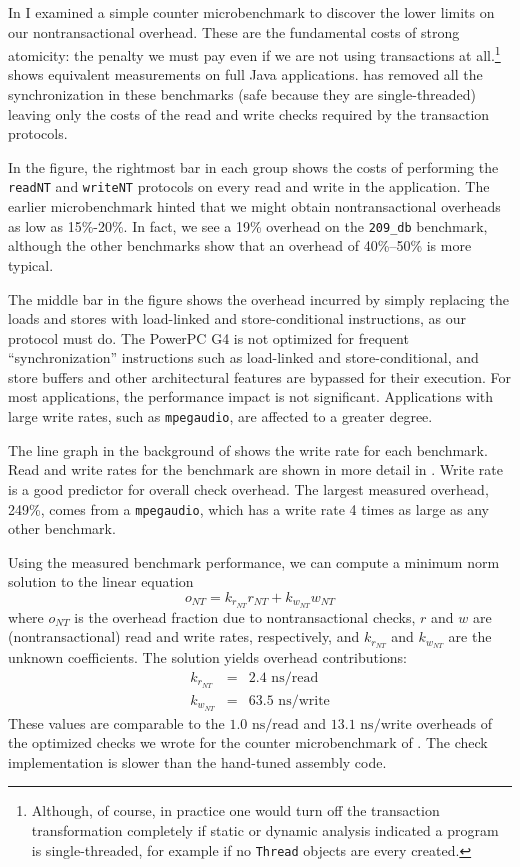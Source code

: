 In  I examined a simple counter microbenchmark
to discover the
lower limits on our nontransactional overhead.  These are the
fundamental costs of strong atomicity: the penalty we must pay even if
we are not using transactions at all.\footnote{Although, of course, in
  practice one would turn off the transaction transformation
  completely if static or dynamic analysis indicated a program is
  single-threaded, for example if no \texttt{Thread} objects are every
  created.}   shows equivalent measurements on
full Java applications.  \Flex has removed all the synchronization in
these benchmarks (safe because they are single-threaded) leaving only
the costs of the read and write checks required by the transaction
protocols.

In the figure, the rightmost bar in each group shows the costs of
performing the \texttt{readNT} and \texttt{writeNT} protocols on every
read and write in the application.  
The earlier microbenchmark hinted that we might obtain
nontransactional overheads as low as 15\%-20\%.
In fact, we see a 19\%
overhead on the \texttt{209\_db} benchmark, although the other
benchmarks show that an overhead of 40\%--50\% is more typical.

The middle bar in the figure shows the overhead incurred by simply
replacing the loads and stores with load-linked and store-conditional
instructions, as our protocol must do.  The PowerPC G4 is not optimized
for frequent ``synchronization'' instructions such as
load-linked and store-conditional, and store buffers and other
architectural features are bypassed for their execution.  For most
applications, the performance impact is not significant.  Applications
with large write rates, such as \texttt{mpegaudio}, are affected to a
greater degree.

The line graph in the background of  shows the
write rate for each benchmark.  Read and write rates for the benchmark
are shown in more detail in .  Write rate is
a good predictor for overall check overhead. 
The largest measured overhead, 249\%, comes from
a \texttt{mpegaudio}, which has a write rate 4 times as large as any
other benchmark. 

Using the measured benchmark performance, we can compute a minimum norm
solution to the linear equation 
\begin{equation}\label{eqn:nt-perf}
o_{NT} = k_{r_{NT}} r_{NT} + k_{w_{NT}} w_{NT}
\end{equation}
where $o_{NT}$ is the overhead fraction due to nontransactional checks,
$r$ and $w$ are (nontransactional) read and write rates, respectively,
and $k_{r_{NT}}$ and $k_{w_{NT}}$
are the unknown coefficients.  The solution yields overhead
contributions:
\begin{eqnarray*}
k_{r_{NT}} &=& 2.4 \text{ ns}/\text{read} \\
k_{w_{NT}} &=& 63.5 \text{ ns}/\text{write}
\end{eqnarray*}
These values are comparable to the
$1.0 \text{ ns}/\text{read}$ and $13.1 \text{ ns}/\text{write}$
overheads of the optimized checks we wrote for the counter
microbenchmark of .  The \apex
check implementation is slower than the hand-tuned assembly code.


